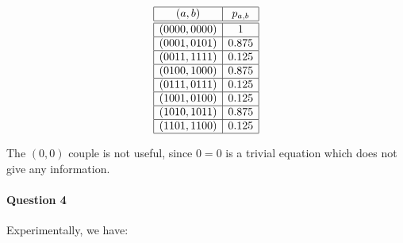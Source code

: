 \documentclass[a4paper]{article}
\begin{document}
\begin{equation*}
\begin{array}{|c|c|}
\hline
(a,b) & p_{a,b} \\
\hline
\hline
(0000,0000) & 1 \\
\hline
(0001,0101) & 0.875 \\
\hline
(0011,1111) & 0.125 \\
\hline
(0100,1000) & 0.875 \\
\hline
(0111,0111) & 0.125 \\
\hline
(1001,0100) & 0.125 \\
\hline
(1010,1011) & 0.875 \\
\hline
(1101,1100) & 0.125 \\
\hline
\end{array}
\end{equation*}

The $(0,0)$ couple is not useful, since $0=0$ is a trivial equation which does not give any information.

\paragraph{Question 4}

Experimentally, we have:
\end{document}

